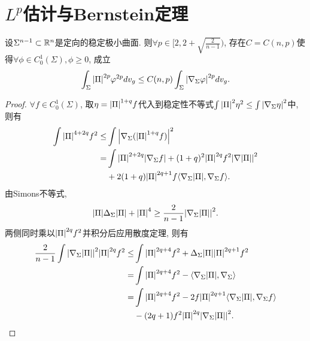 \section{\texorpdfstring{$L^p$}{Lp}估计与Bernstein定理}
\begin{theorem} \label{ssy}
    设$\Sigma^{n-1}\subset {\mathbb{R}}^n$是定向的稳定极小曲面. 则$\forall p \in [2, 2+\sqrt{\frac{2}{n-1}})$, 存在$C=C(n,p)$使得$\forall \phi \in C^1_0(\Sigma), \phi \ge 0$, 成立 
    \begin{equation}\label{ssye}
        \int_\Sigma {\left | {\Pi}\right |}^{2p}{\varphi}^{2p}dv_g \le C(n,p) \int_\Sigma {\left | \nabla_\Sigma {\varphi}\right |}^{2p}dv_g.
    \end{equation}
\end{theorem}
\begin{proof}
    $\forall f \in C^1_0(\Sigma)$, 取$\eta={\left | {\Pi} \right |}^{1+q}f$代入到稳定性不等式$\int{\left | {\Pi}\right |}^2 \eta^2\le \int {\left | \nabla_\Sigma \eta \right |}^2$中, 则有
    \begin{equation} \label{ssy1}
        \begin{split}
            \int {\left | {\Pi}\right |}^{4+2q}f^2  \le& \int {\left | \nabla_\Sigma ({\left | {\Pi}\right |}^{1+q}f) \right |}^2 \\
            =& \int {\left | {\Pi}\right |}^{2+2q} {\left | \nabla_\Sigma f \right |} + (1+q)^2 {\left | {\Pi} \right |}^{2q}f^2 {\left | \nabla {\left | {\Pi}\right |} \right |}^2  \\
            &+ 2(1+q){\left | {\Pi} \right |}^{2q+1}f{\left < \nabla_\Sigma {\left | {\Pi}\right |}, \nabla_\Sigma f \right >}.
        \end{split}
    \end{equation}
    由Simons不等式,
    \begin{equation}
        {\left | {\Pi}\right |}\Delta_\Sigma{\left | {\Pi}\right |} + {\left | {\Pi} \right |}^4 \ge \frac{2}{n-1}{\left | \nabla_\Sigma {\left | {\Pi}\right |} \right |}^2.
    \end{equation}
    两侧同时乘以${\left | {\Pi} \right |}^{2q}f^2$并积分后应用散度定理, 则有
    \begin{equation} \label{ssy2}
        \begin{split}
            \frac{2}{n-1}\int \abs{\nabla_\Sigma \abs{\II}}^2 \abs{\II}^{2q}f^2 \le&  \int \abs{\II}^{2q+4}f^2 + \Delta_\Sigma \abs{\II} \abs{\II}^{2q+1}f^2 \\
            =&\int \abs{\II}^{2q+4}f^2-\inner{\nabla_\Sigma \abs{\II}}{\nabla_\Sigma}\\
            =&\int \abs{\II}^{2q+4}f^2-2f\abs{\II}^{2q+1}\inner{\nabla_\Sigma \abs{\II}}{\nabla_\Sigma f}\\
            &-(2q+1)f^2\abs{\II}^{2q} \abs{\nabla_\Sigma\abs{\II}}^2.
        \end{split}

\end{equation}
\end{proof}
